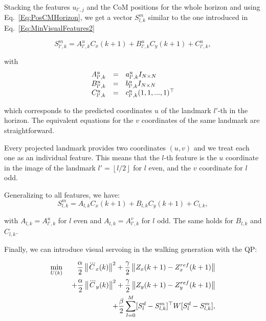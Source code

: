 Stacking the features $u_{l',j}$ and the CoM positions for the whole horizon and using Eq.~\ref{Eq:PosCMHorizon}, we get a vector $S^m_{l,k}$ similar to the one introduced in Eq.~\ref{Eq:MinVisualFeatures2} 

\begin{equation*}
S^m_{l',k} = A^u_{l',k} C_x(k+1) + B^u_{l',k} C_y(k+1) + C_{l',k}^u,
\end{equation*}

with 
$$
\begin{array}{ccl}
A^u_{l',k} &=& a^u_{l',k} I_{N\times N}\\
B^u_{l',k} &=& b^u_{l',k} I_{N\times N}\\
C_{l',k}^u &=& c^u_{l',k} (1,1,...,1)^{\top}
\end{array}
$$

 which corresponds to the predicted coordinates $u$ of the landmark $l'$-th in the horizon.
The equivalent equations for the $v$ coordinates of the same landmark are straightforward.

Every projected landmark provides two coordinates $(u,v)$ and we treat each one as an individual feature. This means that the $l$-th feature is the $u$ coordinate in the image of the landmark $l' = \left \lfloor l/2 \right \rfloor$ for $l$ even, and the $v$ coordinate for $l$ odd.

Generalizing to all features, we have:
\begin{equation}
\label{Eq:FeaturesStacked}
 S^m_{l,k} = A_{l,k} C_x(k+1) + B_{l,k} C_y(k+1) + C_{l,k},
\end{equation}

with $A_{l,k} = A^u_{l',k}$ for $l$ even and $A_{l,k} = A^v_{l',k}$ for $l$ odd. The same holds for $B_{l,k}$ and $C_{l,k}$.

Finally, we can introduce visual servoing in the walking generation with the QP:

\begin{eqnarray*}
\label{Eq:MainQP}
\nonumber
 \min_{U(k)} \; && \dfrac{\alpha}{2} \left\| \dddot{C}_x(k) \right\|^2
 + \dfrac{\gamma}{2} \left\| Z_x(k+1) - Z_x^{ref}(k+1) \right\| \\
 \nonumber
 && + \dfrac{\alpha}{2} \left\| \dddot{C}_y(k) \right\|^2
 + \dfrac{\gamma}{2} \left\| Z_y(k+1) - Z_y^{ref}(k+1) \right\| \\
 \nonumber
 && + \dfrac{\beta}{2} \sum\limits_{l=0}^{M}  [S^d_{l}- S^m_{l,k}]^{\top} W [S^d_{l} - S^m_{l,k}],
\end{eqnarray*}

